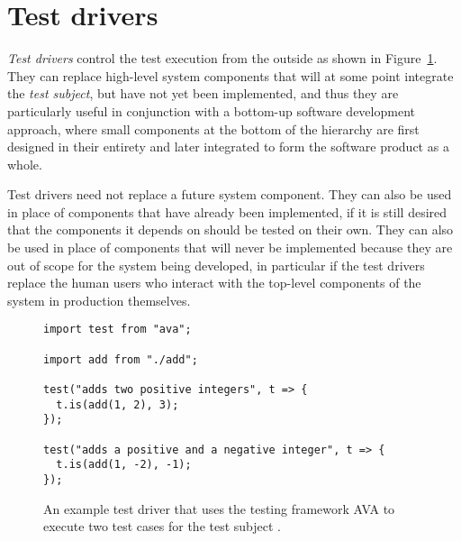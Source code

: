 \section{Test drivers}
\textit{Test drivers} control the test execution from the outside
\autocite{TestingTheoryDriver}
as shown in Figure~\ref{fig:TestDriver}.
They can replace high-level system components that will
at some point integrate the \textit{test subject},
but have not yet been implemented,
and thus they are particularly useful in conjunction with
a bottom-up software development approach,
where small components at the bottom of the hierarchy
are first designed in their entirety
and later integrated to form the software product as a whole.

Test drivers need not replace a future system component.
They can also be used in place of components that
have already been implemented,
if it is still desired that the components it depends on
should be tested on their own.
They can also be used in place of components that
will never be implemented
because they are out of scope for the system being developed,
in particular if the test drivers replace the human users who interact
with the top-level components of the system in production themselves.
\autocite{ArtOfSoftwareTesting}

\begin{figure}
  \begin{verbatim}
import test from "ava";

import add from "./add";

test("adds two positive integers", t => {
  t.is(add(1, 2), 3);
});

test("adds a positive and a negative integer", t => {
  t.is(add(1, -2), -1);
});
  \end{verbatim}
  \caption{
    An example test driver that uses the testing framework AVA
    \autocite{AvaGithub}
    to execute two test cases for the test subject .
  }\label{fig:TestDriver}
\end{figure}
